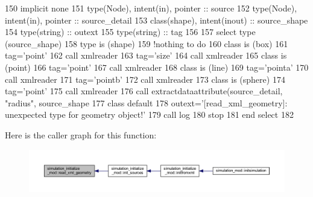 \begin{DoxyCode}
150     \textcolor{keywordtype}{implicit none}
151     \textcolor{keywordtype}{type}(Node), \textcolor{keywordtype}{intent(in)}, \textcolor{keywordtype}{pointer} :: source
152     \textcolor{keywordtype}{type}(Node), \textcolor{keywordtype}{intent(in)}, \textcolor{keywordtype}{pointer} :: source\_detail
153     \textcolor{keywordtype}{class}(shape), \textcolor{keywordtype}{intent(inout)} :: source\_shape
154     \textcolor{keywordtype}{type}(string) :: outext
155     \textcolor{keywordtype}{type}(string) :: tag
156 
157     \textcolor{keywordflow}{select type} (source\_shape)
158 \textcolor{keywordflow}{    type is} (shape)
159         \textcolor{comment}{!nothing to do}
160 \textcolor{keywordflow}{    class is} (box)
161         tag=\textcolor{stringliteral}{'point'}
162         \textcolor{keyword}{call }xmlreader%
163         tag=\textcolor{stringliteral}{'size'}
164         \textcolor{keyword}{call }xmlreader%
165 \textcolor{keywordflow}{    class is} (point)
166         tag=\textcolor{stringliteral}{'point'}
167         \textcolor{keyword}{call }xmlreader%
168 \textcolor{keywordflow}{    class is} (line)
169         tag=\textcolor{stringliteral}{'pointa'}
170         \textcolor{keyword}{call }xmlreader%
171         tag=\textcolor{stringliteral}{'pointb'}
172         \textcolor{keyword}{call }xmlreader%
173 \textcolor{keywordflow}{    class is} (sphere)
174         tag=\textcolor{stringliteral}{'point'}
175         \textcolor{keyword}{call }xmlreader%
176         \textcolor{keyword}{call }extractdataattribute(source\_detail, \textcolor{stringliteral}{"radius"}, source\_shape%
177 \textcolor{keywordflow}{        class default}
178         outext=\textcolor{stringliteral}{'[read\_xml\_geometry]: unexpected type for geometry object!'}
179         \textcolor{keyword}{call }log%
180         stop
181 \textcolor{keywordflow}{    end select}
182 
\end{DoxyCode}
Here is the caller graph for this function\+:
\nopagebreak
\begin{figure}[H]
\begin{center}
\leavevmode
\includegraphics[width=350pt]{namespacesimulation__initialize__mod_ab6e350f9f537c9f62e8ba5aeb023d2a6_icgraph}
\end{center}
\end{figure}
